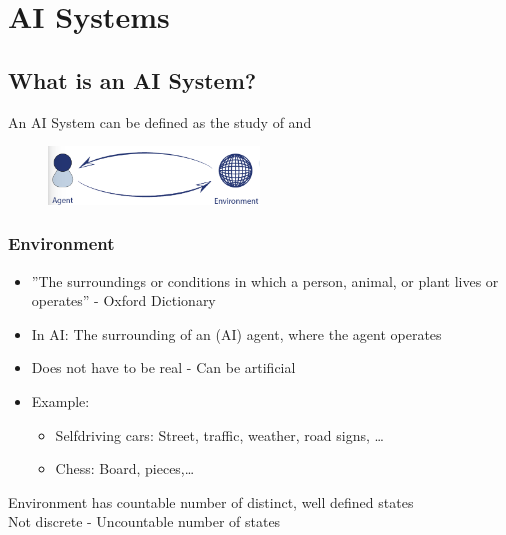 \documentclass[
../../EiKI_Summary.tex,
]
{subfiles}
\begin{document}
\section{AI Systems}
\subsection{What is an AI System?}

\begin{defbox*}
    An AI System can be defined as the study of  and 
\end{defbox*}

\begin{figure}
    [htp]
    \centering
    \includegraphics[width=0.5\textwidth]{Pics/2/Agent_Environment.png}
\end{figure}

\subsubsection{Environment}
\begin{itemize}
    \item ''The surroundings or conditions in which a person, animal, or plant lives or operates'' - Oxford Dictionary
    \item In AI: The surrounding of an (AI) agent, where the agent operates
    \item Does not have to be real - Can be artificial
    \item Example: 
    \begin{itemize}
        \item Selfdriving cars: Street, traffic, weather, road signs, \dots
        \item Chess: Board, pieces,\dots
    \end{itemize}
\end{itemize}


\begin{defbox}
     Environment has countable number of distinct, well defined states\\
     Not discrete - Uncountable number of states
\end{defbox}
\end{document}
